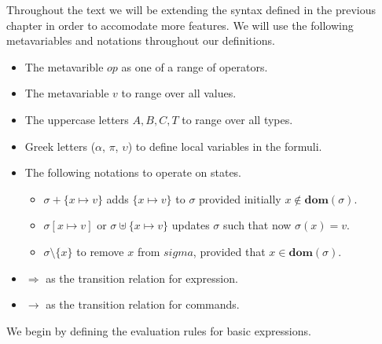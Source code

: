 \documentclass[a4paper,12pt]{report}
\begin{document}
\par
Throughout the text we will be extending the syntax defined in the 
previous chapter in order to accomodate more features. 
We will use the following metavariables and notations throughout our 
definitions.

\renewcommand\labelitemii{$\blacksquare$}
\begin{itemize}
  \item The metavarible $op$ as one of a range of operators. 
  \item The metavariable $v$ to range over all values.
  \item The uppercase letters $A,B,C,T$ to range over all types.
  \item Greek letters ($\alpha$, $\pi$, $\upsilon$) to define local variables in 
  the formuli. 
  \item The following notations to operate on states. 
    \begin{itemize}
      \item $\sigma + \{x \mapsto v\}$ adds $\{x \mapsto v\}$ to $\sigma$ provided initially $x \notin\textbf{dom}(\sigma)$. 
      \item $\sigma[x \mapsto v]$ or $\sigma \uplus \{x \mapsto v\}$ updates $\sigma$ such that now $\sigma(x) = v$.
      \item $\sigma \setminus \{x\}$ to remove $x$ from $sigma$, provided that $x \in \textbf{dom}(\sigma)$.
    \end{itemize}
  \item $\Longrightarrow$ as the transition relation for expression.
  \item $\longrightarrow$ as the transition relation for commands.
\end{itemize}


\par
We begin by defining the evaluation rules for basic expressions. 
\end{document}
